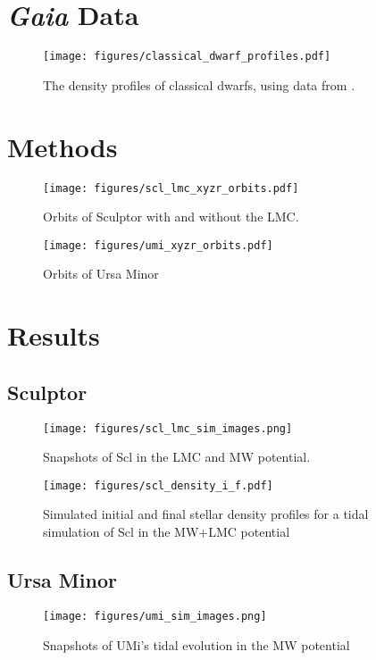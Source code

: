 \documentclass{aa}
\begin{document}
\section{{\it Gaia} Data}

\begin{figure}
    \centering
    \texttt{[image: figures/classical\_dwarf\_profiles.pdf]}
    {\caption{The density profiles of classical dwarfs, using data from \citet{jensen+2024}.}}
    \label{fig:observed_density_profiles}
\end{figure}

\section{Methods}

\begin{figure}
    \centering
    \texttt{[image: figures/scl\_lmc\_xyzr\_orbits.pdf]}
    \caption{
        Orbits of Sculptor with and without the LMC.
    }
    \label{fig:scl_orbits}
\end{figure}


\begin{figure}
    \centering
    \texttt{[image: figures/umi\_xyzr\_orbits.pdf]}
    \caption{
        Orbits of Ursa Minor
    }
    \label{fig:umi_orbits}
\end{figure}


\section{Results}

\subsection{Sculptor}

\begin{figure*}
    \centering
    \texttt{[image: figures/scl\_lmc\_sim\_images.png]}
    \caption{Snapshots of Scl in the LMC and MW potential.}
    \label{fig:scl_sim_images}
\end{figure*}

\begin{figure}
    \centering
    \texttt{[image: figures/scl\_density\_i\_f.pdf]}
    \caption{Simulated initial and final stellar density profiles for a tidal simulation of Scl in the MW+LMC potential} 
    \label{fig:scl_density_i_f}
\end{figure}


\subsection{Ursa Minor}
\begin{figure*}
    \centering
    \texttt{[image: figures/umi\_sim\_images.png]}
    \caption{Snapshots of UMi's tidal evolution in the MW potential}
    \label{fig:umi_sim_images}
\end{figure*}
\end{document}
